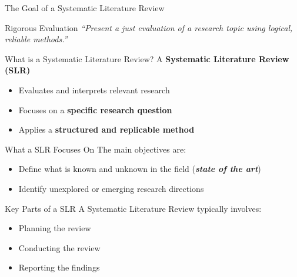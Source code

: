 \begin{frame}{The Goal of a Systematic Literature Review}
  \begin{block}{Rigorous Evaluation}
  \vspace{0.5cm}
    \centering
    \Large\itshape
    ``Present a just evaluation of a research topic using logical, reliable methods.''
  \end{block}

  \vspace{0.5cm}

  \flushright
  \small\textbf{\textcite{Ierandi2017}}
\end{frame}

\begin{frame}{What is a Systematic Literature Review?}
  \centering
  \Large
  A \textbf{Systematic Literature Review (SLR)}

  \vspace{0.5cm}

  \pause

  \normalsize
  \begin{itemize}
    \item Evaluates and interprets relevant research \pause
    \item Focuses on a \textbf{specific research question} \pause
    \item Applies a \textbf{structured and replicable method}
  \end{itemize}
\end{frame}

\begin{frame}{What a SLR Focuses On}
  \Large
  The main objectives are:

  \vspace{0.5cm}

  \pause
  \normalsize
  \begin{itemize}
    \item Define what is known and unknown in the field (\textbf{\textit{state of the art}}) \pause
    \item Identify unexplored or emerging research directions
  \end{itemize}
\end{frame}

\begin{frame}{Key Parts of a SLR}
  \Large
  A Systematic Literature Review typically involves:

  \vspace{0.5cm}

  \pause
  \normalsize
  \begin{itemize}
    \item Planning the review \pause
    \item Conducting the review \pause
    \item Reporting the findings
  \end{itemize}
\end{frame}
